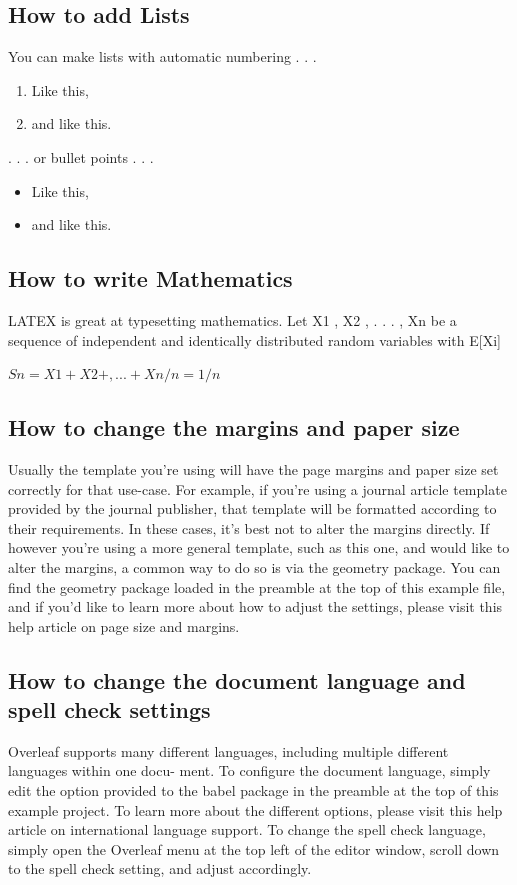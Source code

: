 \documentclass{article}
\begin{document}
\subsection{How to add Lists}
You can make lists with automatic numbering . . .\newline
\begin{enumerate}
	\item  Like this,
	\item and like this.
	\end{enumerate}

. . . or bullet points . . .
\begin{itemize}
	\item Like this,
	\item and like this.
	\end{itemize}
	

\subsection{How to write Mathematics}
LATEX is great at typesetting mathematics. Let X1 , X2 , . . . , Xn be a sequence of independent and
identically distributed random variables with E[Xi]\newline

\begin{math}
	Sn=X1+X2+,...+Xn/n=1/n
\end{math}

\subsection{How to change the margins and paper size}
Usually the template you’re using will have the page margins and paper size set correctly for that
use-case. For example, if you’re using a journal article template provided by the journal publisher,
that template will be formatted according to their requirements. In these cases, it’s best not to alter
the margins directly.
If however you’re using a more general template, such as this one, and would like to alter the
margins, a common way to do so is via the geometry package. You can find the geometry package
loaded in the preamble at the top of this example file, and if you’d like to learn more about how to
adjust the settings, please visit this help article on page size and margins.

\subsection{How to change the document language and spell check settings}
Overleaf supports many different languages, including multiple different languages within one docu-
ment.
To configure the document language, simply edit the option provided to the babel package in the
preamble at the top of this example project. To learn more about the different options, please visit
this help article on international language support.
To change the spell check language, simply open the Overleaf menu at the top left of the editor
window, scroll down to the spell check setting, and adjust accordingly.
\end{document}

